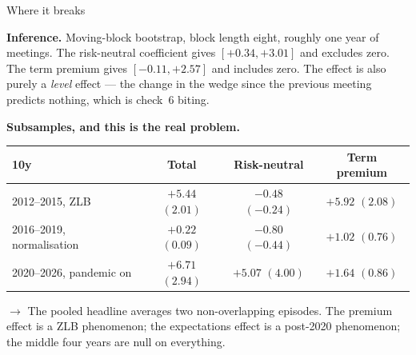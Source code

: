 \documentclass[aspectratio=169, 11pt]{beamer}
\begin{document}
\begin{frame}{Where it breaks}

\textbf{Inference.} Moving-block bootstrap, block length eight, roughly one
year of meetings. The risk-neutral coefficient gives $[+0.34, +3.01]$ and
excludes zero. The term premium gives $[-0.11, +2.57]$ and
\textcolor{killred}{includes zero}. The effect is also purely a
\emph{level} effect --- the change in the wedge since the previous meeting
predicts nothing, which is check~6 biting.

\vspace{0.7em}

\textbf{Subsamples, and this is the real problem.}

\begin{center}
\small
\begin{tabular}{lccc}
\toprule
10y & Total & Risk-neutral & Term premium \\
\midrule
2012--2015, ZLB              & $+5.44$ \; $(2.01)$ & $-0.48$ \; $(-0.24)$ & $\mathbf{+5.92}$ \; $(2.08)$ \\
2016--2019, normalisation    & $+0.22$ \; $(0.09)$ & $-0.80$ \; $(-0.44)$ & $+1.02$ \; $(0.76)$ \\
2020--2026, pandemic on      & $+6.71$ \; $(2.94)$ & $\mathbf{+5.07}$ \; $(4.00)$ & $+1.64$ \; $(0.86)$ \\
\bottomrule
\end{tabular}
\end{center}

\vspace{0.7em}

$\rightarrow$ The pooled headline averages two non-overlapping episodes. The
premium effect is a ZLB phenomenon; the expectations effect is a post-2020
phenomenon; the middle four years are null on everything.

\end{frame}
\end{document}
